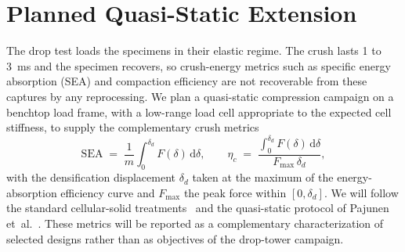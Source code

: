 \documentclass[11pt]{article}
\begin{document}
\section{Planned Quasi-Static Extension}
\label{si:quasistatic}
The drop test loads the
specimens in their elastic regime. The crush lasts 1 to \SI{3}{ms} and
the specimen recovers, so crush-energy metrics such as specific energy
absorption (SEA) and compaction efficiency are not recoverable from
these captures by any reprocessing. We plan a quasi-static compression
campaign on a benchtop load frame, with a low-range load cell
appropriate to the expected cell stiffness,
to supply the complementary crush metrics
\begin{equation}
  \mathrm{SEA} \;=\; \frac{1}{m}\!\int_{0}^{\delta_d}\! F(\delta)\,
  \mathrm{d}\delta,
  \qquad
  \eta_c \;=\; \frac{\int_{0}^{\delta_d}\! F(\delta)\,\mathrm{d}\delta}{F_{\max}\,\delta_d},
\end{equation}
with the densification displacement $\delta_d$ taken at the maximum of
the energy-absorption efficiency curve and $F_{\max}$ the peak force
within $[0,\delta_d]$. We will follow the standard cellular-solid
treatments~\citep{gibson1997cellular, avalle2001characterization,
tan2005dynamic, li2006densification} and the
quasi-static protocol of Pajunen et~al.~\citep{pajunen2019design}.
These metrics will be reported as a complementary characterization of
selected designs rather than as objectives of the drop-tower campaign.

\end{document}
